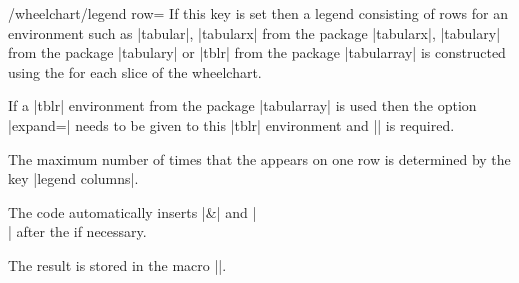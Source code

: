\documentclass[a4paper,english,dvipsnames]{ltxdoc}
\begin{document}
\begin{key}{/wheelchart/legend row=}
If this key is set then a legend consisting of rows for an environment such as |tabular|, |tabularx| from the package |tabularx|, |tabulary| from the package |tabulary| or |tblr| from the package |tabularray| is constructed using the  for each slice of the wheelchart.

If a |tblr| environment from the package |tabularray| is used then the option |expand=\WClegend| needs to be given to this |tblr| environment and || is required.

The maximum number of times that the  appears on one row is determined by the key |legend columns|.

The code automatically inserts |&| and |\\| after the  if necessary.

The result is stored in the macro |\WClegend|.
\begin{codeexample}[preamble={\usepackage{tabularray}
\UseTblrLibrary{counter,siunitx}}]
\begin{tikzpicture}
\wheelchart[
    after slices={
        \pgfdeclareradialshading{WCshading}{\pgfpoint{0cm}{0cm}}{
            color(0bp)=(\WCvarB);
            color(16.66666bp)=(\WCvarB);%
            color(20.83333bp)=(\WCvarB!10);%
            color(25bp)=(\WCvarB);
            color(50bp)=(\WCvarB)
        }
        \shade[even odd rule,shading=WCshading] (0,0) circle[radius=3] circle[radius=2];
    },
    data=,
    legend row={\tikz\fill[\WCvarB] (0,0) rectangle (0.3,0.3);%
         & \WCvarC & \WCvarA & \WCpercentagerounded & \WCvarD},
    legend={
        \node[anchor=west] at (3.5,0) {%
            \begin{tblr}[expand=\WClegend]{
                colspec={llS[table-format=3.0]S[table-format=2.0{\,\unit{\percent}}]l},
                column{1}={rightsep=0pt,appto={\ }},
                column{2}={leftsep=0pt},
                cell{2-Y}{4}={appto={\,\unit{\percent}}},
                row{1}={guard}
            }
             & Fruit & Value & Percentage & Vitamins\\\hline
            \WClegend\hline
             & \textbf{Total} & \WCtotalnum & & \\
            \end{tblr}%
        };
    },
    slices style={
        fill=none,
        clip
    }
]{\exampleforthismanual}
\end{tikzpicture}
\end{codeexample}
\end{key}
\end{document}
